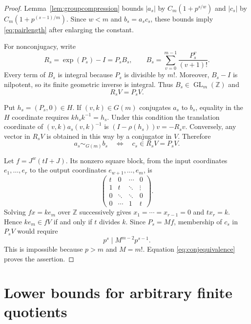 \documentclass[11pt,letterpaper]{amsart}
\numberwithin{equation}{section}
\theoremstyle{remark}
\newcommand{\Z}{\mathbb Z}
\newcommand{\GL}{\operatorname{GL}}
\begin{document}
\begin{proof}
Lemma~\ref{lem:groupcompression} bounds $|a_s|$ by
$C_m(1+p^{s/w})$ and $|c_s|$ by $C_m(1+p^{(s-1)/m})$.
Since $w<m$ and $b_s=a_sc_s$, these bounds imply
\eqref{eq:pairlength} after enlarging the constant.

For nonconjugacy, write
\begin{equation}\label{eq:R}
 R_s=\exp(P_s)-I=P_sB_s,\qquad
 B_s=\sum_{v=0}^{m-1}\frac{P_s^v}{(v+1)!}.
\end{equation}
Every term of $B_s$ is integral because $P_s$ is divisible by $m!$.
Moreover, $B_s-I$ is nilpotent, so its finite geometric inverse is
integral. Thus $B_s\in\GL_m(\Z)$ and
\begin{equation}\label{eq:integralimage}
 R_sV=P_sV.
\end{equation}

Put $h_s=(P_s,0)\in H$. If $(v,k)\in G(m)$ conjugates $a_s$ to
$b_s$, equality in the $H$ coordinate requires
$kh_sk^{-1}=h_s$. Under this condition the translation coordinate of
$(v,k)a_s(v,k)^{-1}$ is $(I-\rho(h_s))v=-R_sv$. Conversely, any
vector in $R_sV$ is obtained in this way by a conjugator in $V$.
Therefore
\begin{equation}\label{eq:conjequivalence}
 a_s\sim_{G(m)}b_s\quad\Longleftrightarrow\quad
 c_s\in R_sV=P_sV.
\end{equation}

Let $f=J^w(tI+J)$. Its nonzero square block, from the input
coordinates $e_1,\ldots,e_r$ to the output coordinates
$e_{w+1},\ldots,e_m$, is
\[
 \begin{pmatrix}
 t&0&\cdots&0\\
 1&t&\ddots&\vdots\\
 0&\ddots&\ddots&0\\
 0&\cdots&1&t
 \end{pmatrix}.
\]
Solving $fx=k e_m$ over $\Z$ successively gives
$x_1=\cdots=x_{r-1}=0$ and $t x_r=k$. Hence $k e_m\in fV$ if
and only if $t$ divides $k$. Since $P_s=Mf$, membership of $c_s$ in
$P_sV$ would require
\[
 p^s\mid M^{m-2}p^{s-1}.
\]
This is impossible because $p>m$ and $M=m!$. Equation
\eqref{eq:conjequivalence} proves the assertion.
\end{proof}

\section{Lower bounds for arbitrary finite quotients}\label{sec:quotients}
\end{document}
